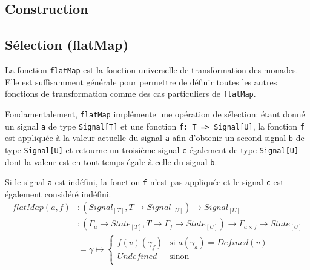 	\subsection{Construction}
	
		\begin{center}
		\end{center}

	\subsection{Sélection (flatMap)}
	
		\begin{center}
		\end{center}
	
		La fonction \texttt{flatMap} est la fonction universelle de transformation des monades. Elle est suffisamment générale pour permettre de définir toutes les autres fonctions de transformation comme des cas particuliers de \texttt{flatMap}.
		
		Fondamentalement, \texttt{flatMap} implémente une opération de sélection: étant donné un signal \texttt{a} de type \texttt{Signal[T]} et une fonction \texttt{f: T => Signal[U]}, la fonction \texttt{f} est appliquée à la valeur actuelle du signal \texttt{a} afin d'obtenir un second signal \texttt{b} de type \texttt{Signal[U]} et retourne un troisième signal \texttt{c} également de type \texttt{Signal[U]} dont la valeur est en tout temps égale à celle du signal \texttt{b}.
		
		Si le signal \texttt{a} est indéfini, la fonction \texttt{f} n'est pas appliquée et le signal \texttt{c} est également considéré indéfini.
		\begin{align*}
			flatMap(a, f)
				&\colon (Signal_{[T]}, T \to Signal_{[U]}) \to Signal_{[U]} \\
				&\colon (\Gamma_a \to State_{[T]}, T \to \Gamma_f \to State_{[U]}) \to \Gamma_{a \times f} \to State_{[U]} \\
				&= \gamma \mapsto \begin{cases}
					f(v)(\gamma_f) & \text{si } a(\gamma_a) = Defined(v)\\
					Undefined & \text{sinon}\\
				\end{cases}
		\end{align*}
	
